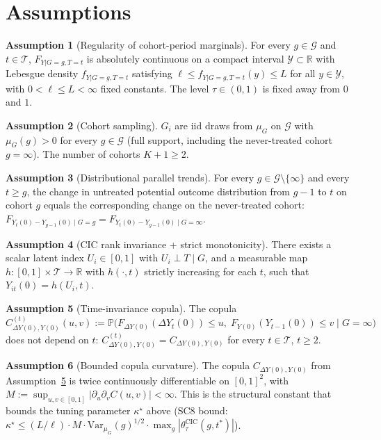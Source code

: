 \documentclass[11pt]{article}
\renewcommand{\Pr}{\mathbb{P}}
\newcommand{\R}{\mathbb{R}}
\theoremstyle{definition}
\newtheorem{assumption}{Assumption}
\theoremstyle{plain}
\theoremstyle{remark}
\begin{document}
\section{Assumptions}

\begin{assumption}[Regularity of cohort-period marginals]\label{a:reg}
For every $g \in \mathcal{G}$ and $t \in \mathcal{T}$, $F_{Y|G=g,T=t}$ is absolutely continuous on a compact interval $\mathcal{Y} \subset \R$ with Lebesgue density $f_{Y|G=g,T=t}$ satisfying $\ell \le f_{Y|G=g,T=t}(y) \le L$ for all $y \in \mathcal{Y}$, with $0 < \ell \le L < \infty$ fixed constants. The level $\tau \in (0,1)$ is fixed away from $0$ and $1$.
\end{assumption}

\begin{assumption}[Cohort sampling]\label{a:cohort}
$G_i$ are iid draws from $\mu_G$ on $\mathcal{G}$ with $\mu_G(g) > 0$ for every $g \in \mathcal{G}$ (full support, including the never-treated cohort $g = \infty$). The number of cohorts $K + 1 \ge 2$.
\end{assumption}

\begin{assumption}[Distributional parallel trends]\label{a:dpt}
For every $g \in \mathcal{G} \setminus \{\infty\}$ and every $t \ge g$, the change in untreated potential outcome distribution from $g-1$ to $t$ on cohort $g$ equals the corresponding change on the never-treated cohort: $F_{Y_t(0) - Y_{g-1}(0) \mid G = g} = F_{Y_t(0) - Y_{g-1}(0) \mid G = \infty}$.
\end{assumption}

\begin{assumption}[CIC rank invariance + strict monotonicity]\label{a:cic}
There exists a scalar latent index $U_i \in [0,1]$ with $U_i \perp T \mid G$, and a measurable map $h: [0,1] \times \mathcal{T} \to \R$ with $h(\cdot, t)$ strictly increasing for each $t$, such that $Y_{it}(0) = h(U_i, t)$.
\end{assumption}

\begin{assumption}[Time-invariance copula]\label{a:tcop}
The copula $C_{\Delta Y(0), Y(0)}^{(t)}(u, v) := \Pr\!\big(F_{\Delta Y(0)}(\Delta Y_t(0)) \le u,\; F_{Y(0)}(Y_{t-1}(0)) \le v \mid G = \infty\big)$ does not depend on $t$: $C^{(t)}_{\Delta Y(0), Y(0)} = C_{\Delta Y(0), Y(0)}$ for every $t \in \mathcal{T}$, $t \ge 2$.
\end{assumption}

\begin{assumption}[Bounded copula curvature]\label{a:curv}
The copula $C_{\Delta Y(0), Y(0)}$ from Assumption~\ref{a:tcop} is twice continuously differentiable on $[0,1]^2$, with $M := \sup_{u, v \in [0,1]} |\partial_u \partial_v C(u,v)| < \infty$. This is the structural constant that bounds the tuning parameter $\kappa^\star$ above (SC8 bound: $\kappa^\star \le (L/\ell) \cdot M \cdot \mathrm{Var}_{\mu_G}(g)^{1/2} \cdot \max_g |\theta^{\mathrm{CIC}}_\tau(g,t^*)|$).
\end{assumption}
\end{document}
